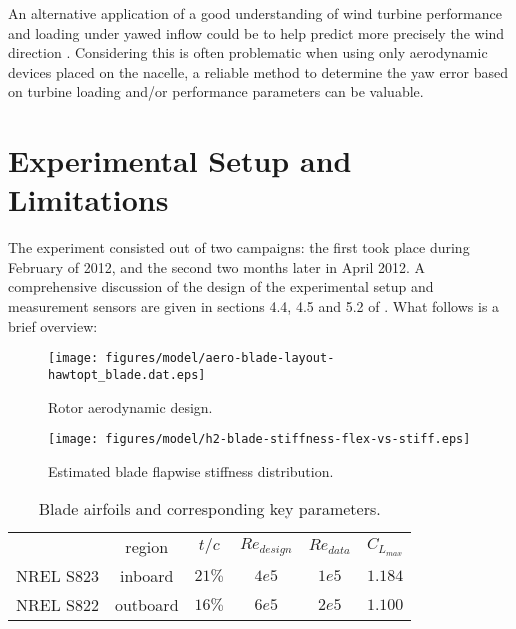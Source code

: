 \documentclass[a4paper]{jpconf}
\begin{document}
An alternative application of a good understanding of wind turbine performance and loading under yawed inflow could be to help predict more precisely the wind direction \cite{bottasso_validation_2015}. Considering this is often problematic when using only aerodynamic devices placed on the nacelle, a reliable method to determine the yaw error based on turbine loading and/or performance parameters can be valuable.


\section{Experimental Setup and Limitations}


The experiment consisted out of two campaigns: the first took place during February of 2012, and the second two months later in April 2012. A comprehensive discussion of the design of the experimental setup and measurement sensors are given in sections 4.4, 4.5 and 5.2 of \cite{verelst_numerical_2013:diss}. What follows is a brief overview:

\begin{figure}[h]
\begin{minipage}{17pc}
\texttt{[image: figures/model/aero-blade-layout-hawtopt\_blade.dat.eps]}
\caption{\label{rotor-aero-design} Rotor aerodynamic design.}
\end{minipage}\hspace{3pc}%
\begin{minipage}{17pc}
\vspace{10px}
\texttt{[image: figures/model/h2-blade-stiffness-flex-vs-stiff.eps]}
\caption{\label{h2-blade-stiffness} Estimated blade flapwise stiffness distribution.}
\end{minipage} 
\end{figure}

\begin{table}
\centering
\begin{tabular}{c c c c c c}
\hline
          & region & $t/c$ & $Re_{design}$ & $Re_{data}$ & $C_{L_{max}}$ \\
NREL S823 & inboard  & $21\%$ & $4e5$      & $1e5$      & $1.184$ \\
NREL S822 & outboard & $16\%$ & $6e5$      & $2e5$      & $1.100$ \\
\hline
\end{tabular}
\caption{Blade airfoils and corresponding key parameters.}
\label{table:S822_S823_keyproperties}
\end{table}
\end{document}
